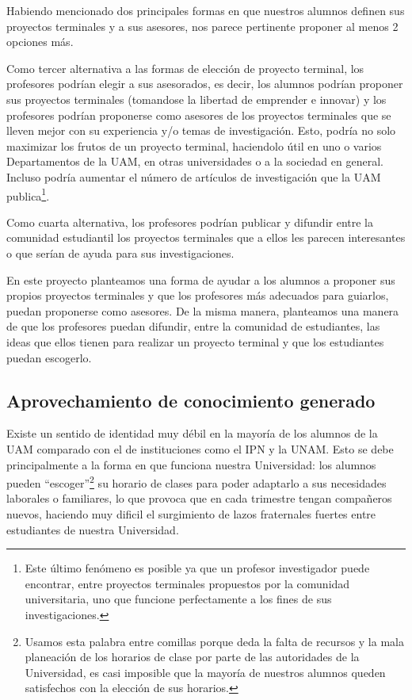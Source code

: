 \documentclass[11pt,letterpaper,titlepage]{article}
\begin{document}
Habiendo mencionado dos principales formas en que nuestros alumnos definen sus proyectos terminales y a sus asesores, nos parece pertinente proponer al menos 2 opciones m\'as.

Como tercer alternativa a las formas de elecci\'on de proyecto terminal, los profesores podr\'ian elegir a sus asesorados, es decir, los alumnos podr\'ian proponer sus proyectos terminales (tomandose la libertad de emprender e innovar) y los profesores podr\'ian proponerse como asesores de los proyectos terminales que se lleven mejor con su experiencia y/o temas de investigaci\'on. Esto, podr\'ia no solo maximizar los frutos de un proyecto terminal, haciendolo \'util en uno o varios Departamentos de la UAM, en otras universidades o a la sociedad en general. Incluso podr\'ia aumentar el n\'umero de art\'iculos de investigaci\'on que la UAM publica\footnote{Este \'ultimo fen\'omeno es posible ya que un profesor investigador puede encontrar, entre proyectos terminales propuestos por la comunidad universitaria, uno que funcione perfectamente a los fines de sus investigaciones.}.

Como cuarta alternativa, los profesores podr\'ian publicar y difundir entre la comunidad estudiantil los proyectos terminales que a ellos les parecen interesantes o que ser\'ian de ayuda para sus investigaciones.

En este proyecto planteamos una forma de ayudar a los alumnos a proponer sus propios proyectos terminales y que los profesores m\'as adecuados para guiarlos, puedan proponerse como asesores. De la misma manera, planteamos una manera de que los profesores puedan difundir, entre la comunidad de estudiantes, las ideas que ellos tienen para realizar un proyecto terminal y que los estudiantes puedan escogerlo.

\subsection{Aprovechamiento de conocimiento generado}
Existe un sentido de identidad muy d\'ebil en la mayor\'ia de los alumnos de la UAM comparado con el de instituciones como el IPN y la UNAM. Esto se debe principalmente a la forma en que funciona nuestra Universidad: los alumnos pueden ``escoger''\footnote{Usamos esta palabra entre comillas porque deda la falta de recursos y la mala planeaci\'on de los horarios de clase por parte de las autoridades de la Universidad, es casi imposible que la mayor\'ia de nuestros alumnos queden satisfechos con la elecci\'on de sus horarios.}  su horario de clases para poder adaptarlo a sus necesidades laborales o familiares, lo que provoca que en cada trimestre tengan compa\~neros nuevos, haciendo muy dificil el surgimiento de lazos fraternales fuertes entre estudiantes de nuestra Universidad.
\end{document}

